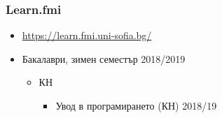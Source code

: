 \documentclass{beamer}
\begin{document}
\begin{frame}
  \frametitle{Learn.fmi}

  \begin{itemize}
  \item \url{https://learn.fmi.uni-sofia.bg/}
  \item Бакалаври, зимен семестър 2018/2019
    \begin{itemize}
    \item КН
      \begin{itemize}
      \item Увод в програмирането (КН) 2018/19
      \end{itemize}
    \end{itemize}
  \end{itemize}
\end{frame}
\end{document}

